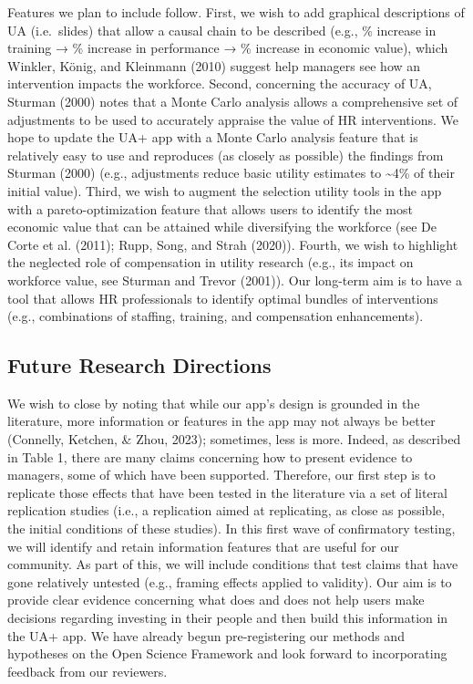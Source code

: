\documentclass[
  english,
  man]{apa6}
\begin{document}
Features we plan to include follow. First, we wish to add graphical descriptions of UA (i.e.~slides) that allow a causal chain to be described (e.g., \% increase in training → \% increase in performance → \% increase in economic value), which Winkler, König, and Kleinmann (2010) suggest help managers see how an intervention impacts the workforce. Second, concerning the accuracy of UA, Sturman (2000) notes that a Monte Carlo analysis allows a comprehensive set of adjustments to be used to accurately appraise the value of HR interventions. We hope to update the UA+ app with a Monte Carlo analysis feature that is relatively easy to use and reproduces (as closely as possible) the findings from Sturman (2000) (e.g., adjustments reduce basic utility estimates to \textasciitilde4\% of their initial value). Third, we wish to augment the selection utility tools in the app with a pareto-optimization feature that allows users to identify the most economic value that can be attained while diversifying the workforce (see De Corte et al. (2011); Rupp, Song, and Strah (2020)). Fourth, we wish to highlight the neglected role of compensation in utility research (e.g., its impact on workforce value, see Sturman and Trevor (2001)). Our long-term aim is to have a tool that allows HR professionals to identify optimal bundles of interventions (e.g., combinations of staffing, training, and compensation enhancements).

\subsection{Future Research Directions}\label{future-research-directions}

We wish to close by noting that while our app's design is grounded in the literature, more information or features in the app may not always be better (Connelly, Ketchen, \& Zhou, 2023); sometimes, less is more. Indeed, as described in Table 1, there are many claims concerning how to present evidence to managers, some of which have been supported. Therefore, our first step is to replicate those effects that have been tested in the literature via a set of literal replication studies (i.e., a replication aimed at replicating, as close as possible, the initial conditions of these studies). In this first wave of confirmatory testing, we will identify and retain information features that are useful for our community. As part of this, we will include conditions that test claims that have gone relatively untested (e.g., framing effects applied to validity). Our aim is to provide clear evidence concerning what does and does not help users make decisions regarding investing in their people and then build this information in the UA+ app. We have already begun pre-registering our methods and hypotheses on the Open Science Framework and look forward to incorporating feedback from our reviewers.
\end{document}
